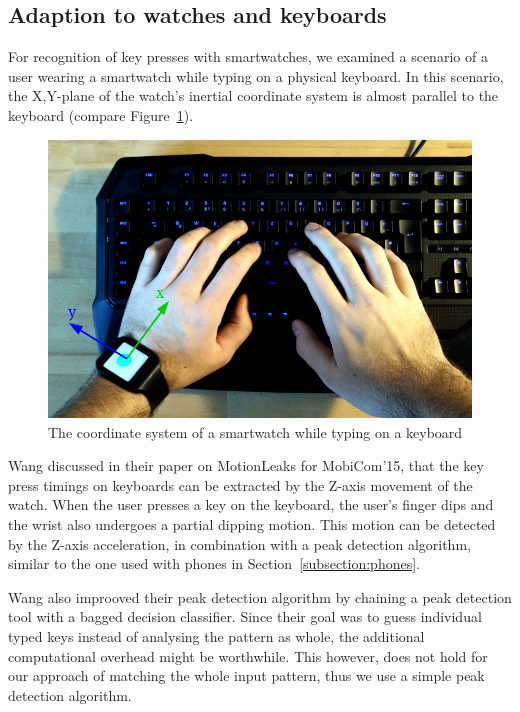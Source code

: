 \subsection{Adaption to watches and keyboards}
For recognition of key presses with smartwatches, we examined a scenario of a user wearing a smartwatch while typing on a physical keyboard. In this scenario, the X,Y-plane of the watch's inertial coordinate system is almost parallel to the keyboard (compare Figure~\ref{fig:watchcoordinate}).

\begin{figure}
    \centering
    \includegraphics[width=\textwidth]{figures/WatchCoordinateSystem.png}
    \caption{The coordinate system of a smartwatch while typing on a keyboard}
    \label{fig:watchcoordinate}
\end{figure}

Wang \etal\cite{wang2015mole} discussed in their paper on MotionLeaks for MobiCom'15, that the key press timings on keyboards can be extracted by the Z-axis movement of the watch. When the user presses a key on the keyboard, the user's finger dips and the wrist also undergoes a partial dipping motion. This motion can be detected by the Z-axis acceleration, in combination with a peak detection algorithm, similar to the one used with phones in Section~\ref{subsection:phones}.

Wang \etal also improoved their peak detection algorithm by chaining a peak detection tool with a bagged decision classifier. Since their goal was to guess individual typed keys instead of analysing the pattern as whole, the additional computational overhead might be worthwhile. This however, does not hold for our approach of matching the whole  input pattern, thus we use a simple peak detection algorithm.

